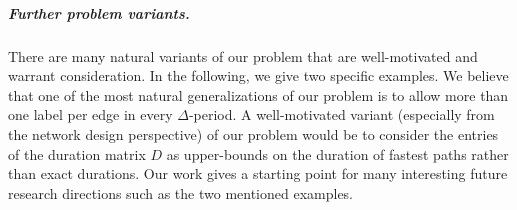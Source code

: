 \documentclass[a4paper,UKenglish,cleveref, autoref, thm-restate]{lipics-v2021}
\begin{document}
\subparagraph{Further problem variants.}
There are many natural variants of our problem that are well-motivated and warrant consideration. In the following, we give two specific examples. We believe that one of the most natural generalizations of our problem is to allow more than one label per edge in every $\Delta$-period. A well-motivated variant (especially from the network design perspective) of our problem would be to consider the entries of the duration matrix $D$ as upper-bounds on the duration of fastest paths rather than exact durations. 
Our work gives a starting point for many interesting future research directions such as the two mentioned examples.

	


\clearpage

\appendix
\end{document}
